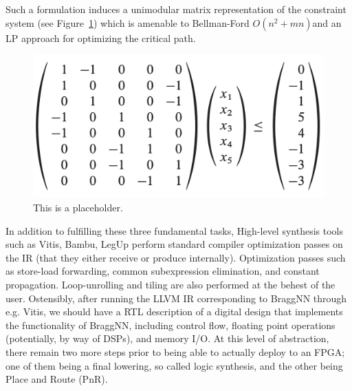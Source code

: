 Such a formulation induces a unimodular matrix representation of the constraint system (see Figure~\ref{fig:unimodular}) which is amenable to Bellman-Ford $O(n^2 + mn)$and an LP approach for optimizing the critical path\cite{1688836}.
\begin{figure}
	\includegraphics[width=\columnwidth]{figures/unimodular}
	\caption{This is a placeholder.}
	\label{fig:unimodular}
\end{figure}

In addition to fulfilling these three fundamental tasks, High-level synthesis tools such as Vitis, Bambu\cite{ferrandi2021bambu}, LegUp\cite{10.1145/2514740} perform standard compiler optimization passes on the IR (that they either receive or produce internally).
Optimization passes such as store-load forwarding, common subexpression elimination, and constant propagation.
Loop-unrolling and tiling are also performed at the behest of the user.
Ostensibly, after running the LLVM IR corresponding to BraggNN through e.g. Vitis, we should have a RTL description of a digital design that implements the functionality of BraggNN, including control flow, floating point operations (potentially, by way of DSPs), and memory I/O.
At this level of abstraction, there remain two more steps prior to being able to actually deploy to an FPGA; one of them being a final lowering, so called logic synthesis, and the other being Place and Route (PnR).

